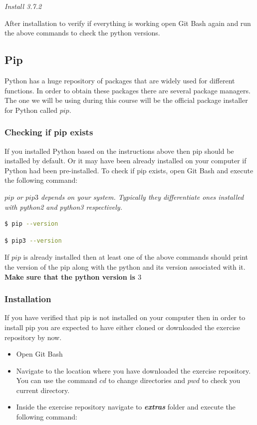 \documentclass{cmc}
\begin{document}
\textbf{}\textit{Install 3.7.2}

After installation to verify if everything is working open Git Bash
again and run the above commands to check the python versions.

\subsection{Pip}
\label{sec-win:pip}

Python has a huge repository of packages that are widely used for
different functions. In order to obtain these packages there are
several package managers. The one we will be using during this course
will be the official package installer for Python called $pip$.

\subsubsection{Checking if pip exists}
\label{sec-win:checking-if-pip}

If you installed Python based on the instructions above then pip
should be installed by default. Or it may have been already installed
on your computer if Python had been pre-installed. To check if pip
exists, open Git Bash and execute the following command:

\textbf{}\textit{$pip$ or $pip3$ depends on your
  system. Typically they differentiate ones installed with python2 and
  python3 respectively.}

\begin{lstlisting}[language=bash]
$ pip --version
\end{lstlisting}

\begin{lstlisting}[language=bash]
$ pip3 --version
\end{lstlisting}

If
$pip$ is already installed then at least one of the above commands
should print the version of the pip along with the python and its
version associated with it. \textbf{Make sure that the python version
  is $3$}

\subsubsection{Installation}
\label{sec-win:installation-pip}
If you have verified that pip is not installed on your computer then
in order to install pip you are expected to have either cloned or
downloaded the exercise repository by now.
\begin{itemize}
\item Open Git Bash
\item Navigate to the location where you have downloaded the exercise
  repository. You can use the command $cd$ to change directories and
  $pwd$ to check you current directory.
\item Inside the exercise repository navigate to
  \textbf{\textit{extras}} folder and execute the following command:
\end{itemize}
\end{document}
